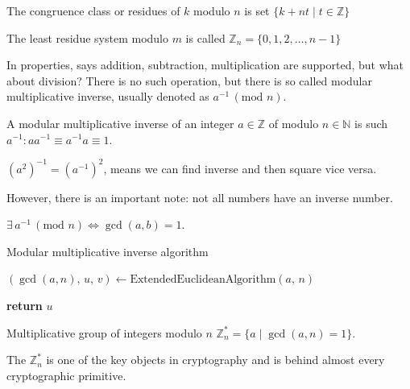 \documentclass[../lecture-notes.tex]{subfiles}
\begin{document}
\begin{definition}
    The congruence class or residues of $k$ modulo $n$ is set $\{ k + nt \mid t \in \mathbb{Z}\}$    
\end{definition}

\begin{definition}
    The least residue system modulo $m$ is called $\mathbb{Z}_n = \{0, 1, 2, \dots, n-1\}$
\end{definition}

In properties, says addition, subtraction, multiplication are supported, but what about division? There is no such operation, but there is so called modular multiplicative inverse, usually denoted as $a^{-1} \, (\text{mod } n)$.

\begin{definition}
    A modular multiplicative inverse of an integer $a \in \mathbb{Z}$ of modulo $n \in \mathbb{N}$ is such $a^{-1}: aa^{-1} \equiv a^{-1}a \equiv 1$.
\end{definition}

\begin{remark}
    $(a^{2})^{-1} = (a^{-1})^{2}$, means we can find inverse and then square vice versa.
\end{remark}

However, there is an important note: not all numbers have an inverse number.

\begin{theorem}
    $\exists \, a^{-1} \, (\text{mod } n) \iff \gcd(a, b) = 1$.
\end{theorem}

\begin{algorithm}
    \caption{Modular multiplicative inverse algorithm} \label{alg:modular_inverse}
        
    $(\gcd(a,n), \, u, \, v) \gets \text{ExtendedEuclideanAlgorithm}(a, \, n)$


    \textbf{return} $u$
\end{algorithm}

\begin{definition}
    Multiplicative group of integers modulo $n$ $\mathbb{Z}_{n}^{*} = \{a \mid \gcd(a, n) = 1\}$.
\end{definition}

The $\mathbb{Z}_{n}^{*}$ is one of the key objects in cryptography and is behind almost every cryptographic primitive.
\end{document}
